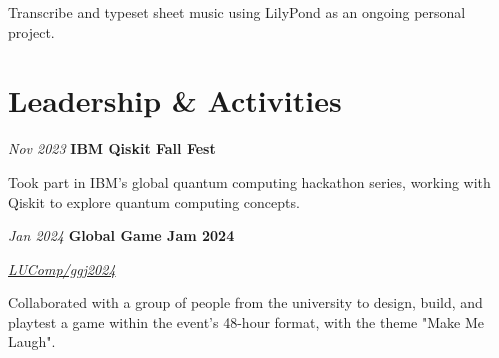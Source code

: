 \documentclass{cv}
\begin{document}
        \vspace{0.10 cm}
        \begin{onecolentry}
            \begin{highlights}
                \item Transcribe and typeset sheet music using LilyPond as an ongoing personal project.
            \end{highlights}
        \end{onecolentry}

    \section{Leadership \& Activities}

        \begin{twocolentry}{
        \textit{Nov 2023}}
            \textbf{IBM Qiskit Fall Fest}
        \end{twocolentry}

        \vspace{0.10 cm}
        \begin{onecolentry}
            \begin{highlights}
                \item Took part in IBM's global quantum computing hackathon series, working with Qiskit to explore quantum computing concepts.
            \end{highlights}
        \end{onecolentry}

        \vspace{0.13 cm}

        \begin{twocolentry}{
        \textit{Jan 2024}}
            \textbf{Global Game Jam 2024}

            \textit{\href{https://github.com/LUComp/ggj2024}{LUComp/ggj2024}}
        \end{twocolentry}

        \vspace{0.10 cm}
        \begin{onecolentry}
            \begin{highlights}
                \item Collaborated with a group of people from the university to design, build, and playtest a game within the event's 48-hour format, with the theme "Make Me Laugh".
            \end{highlights}
        \end{onecolentry}
\end{document}
